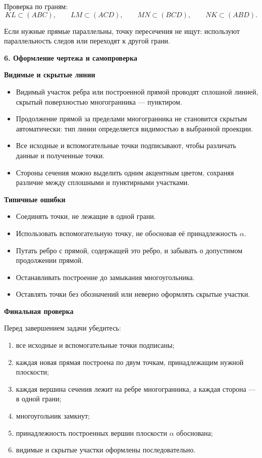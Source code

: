 \documentclass[a4paper,12pt]{article}
\newcommand{\sectitle}[1]{%
  \vspace{0.55em}%
  {\Large\bfseries\color{darkaccent}#1\par}%
  \vspace{0.2em}%
  \noindent{\color{accent}\rule{\linewidth}{0.8pt}}%
  \vspace{0.45em}%
}
\newcommand{\subtopic}[1]{%
  \vspace{0.4em}%
  {\large\bfseries\color{darkaccent}#1\par}%
  \vspace{0.15em}%
}
\begin{document}
Проверка по граням:
\[
KL\subset(ABC),
\qquad
LM\subset(ACD),
\qquad
MN\subset(BCD),
\qquad
NK\subset(ABD).
\]

Если нужные прямые параллельны, точку пересечения не ищут: используют параллельность следов или переходят к другой грани.

\begingroup
{}

\sectitle{6. Оформление чертежа и самопроверка}

\subtopic{Видимые и скрытые линии}

\begin{itemize}
  \item Видимый участок ребра или построенной прямой проводят сплошной линией, скрытый поверхностью многогранника --- пунктиром.
  \item Продолжение прямой за пределами многогранника не становится скрытым автоматически: тип линии определяется видимостью в выбранной проекции.
  \item Все исходные и вспомогательные точки подписывают, чтобы различать данные и полученные точки.
  \item Стороны сечения можно выделить одним акцентным цветом, сохраняя различие между сплошными и пунктирными участками.
\end{itemize}

\subtopic{Типичные ошибки}

\begin{itemize}
  \item Соединять точки, не лежащие в одной грани.
  \item Использовать вспомогательную точку, не обосновав её принадлежность $\alpha$.
  \item Путать ребро с прямой, содержащей это ребро, и забывать о допустимом продолжении прямой.
  \item Останавливать построение до замыкания многоугольника.
  \item Оставлять точки без обозначений или неверно оформлять скрытые участки.
\end{itemize}

\subtopic{Финальная проверка}

Перед завершением задачи убедитесь:
\begin{enumerate}
  \item все исходные и вспомогательные точки подписаны;
  \item каждая новая прямая построена по двум точкам, принадлежащим нужной плоскости;
  \item каждая вершина сечения лежит на ребре многогранника, а каждая сторона --- в одной грани;
  \item многоугольник замкнут;
  \item принадлежность построенных вершин плоскости $\alpha$ обоснована;
  \item видимые и скрытые участки оформлены последовательно.
\end{enumerate}
\end{document}
